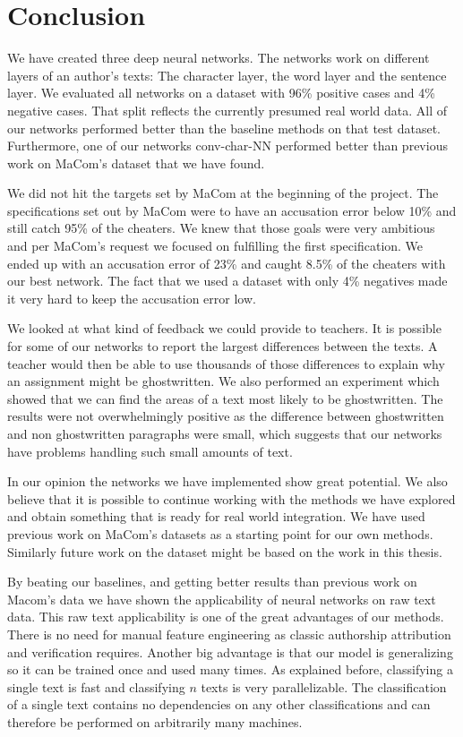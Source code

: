 \section{Conclusion} \label{sec:conclusion}

We have created three deep neural networks. The networks work on different
layers of an author's texts: The character layer, the word layer and the
sentence layer. We evaluated all networks on a dataset with 96\% positive cases
and 4\% negative cases. That split reflects the currently presumed real world
data. All of our networks performed better than the baseline methods on that
test dataset. Furthermore, one of our networks \gls{conv-char-NN} performed
better than previous work on MaCom's dataset that we have found.

We did not hit the targets set by MaCom at the beginning of the project. The
specifications set out by MaCom were to have an accusation error below 10\% and
still catch 95\% of the cheaters. We knew that those goals were very ambitious
and per MaCom's request we focused on fulfilling the first specification. We
ended up with an accusation error of 23\% and caught 8.5\% of the cheaters with
our best network. The fact that we used a dataset with only 4\% negatives made
it very hard to keep the accusation error low.

We looked at what kind of feedback we could provide to teachers. It is possible
for some of our networks to report the largest differences between the texts.
A teacher would then be able to use thousands of those differences to explain
why an assignment might be ghostwritten. We also performed an experiment which
showed that we can find the areas of a text most likely to be ghostwritten. The
results were not overwhelmingly positive as the difference between ghostwritten
and non ghostwritten paragraphs were small, which suggests that our networks
have problems handling such small amounts of text.

In our opinion the networks we have implemented show great potential. We also
believe that it is possible to continue working with the methods we have
explored and obtain something that is ready for real world integration. We have
used previous work on MaCom's datasets as a starting point for our own methods.
Similarly future work on the dataset might be based on the work in this thesis.

By beating our baselines, and getting better results than previous work on
Macom's data we have shown the applicability of neural networks on raw text
data. This raw text applicability is one of the great advantages of our
methods. There is no need for manual feature engineering as classic authorship
attribution and verification requires. Another big advantage is that our model
is generalizing so it can be trained once and used many times. As explained
before, classifying a single text is fast and classifying $n$ texts is very
parallelizable. The classification of a single text contains no dependencies on
any other classifications and can therefore be performed on arbitrarily many
machines.


